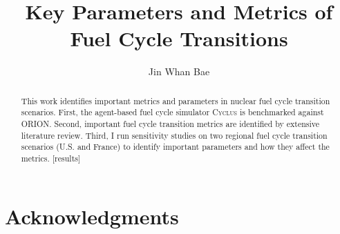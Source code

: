 \documentclass{report}
\newcommand{\Cyclus}{\textsc{Cyclus}\xspace}%
\begin{document}
\title{Key Parameters and Metrics of Fuel Cycle Transitions}
\author{Jin Whan Bae}
\maketitle


\begin{abstract}
This work identifies important metrics and parameters in
nuclear fuel cycle transition scenarios. First, the agent-based
fuel cycle simulator \Cyclus is benchmarked against \gls{ORION}.
Second, important fuel cycle transition metrics are identified
by extensive literature review.
Third, I run sensitivity studies on two regional fuel cycle
transition scenarios (U.S. and France) to identify important
parameters and how they affect the metrics.
[results]

\end{abstract}

\chapter*{Acknowledgments}



\tableofcontents
\listoftables
\listoffigures
\end{document}
